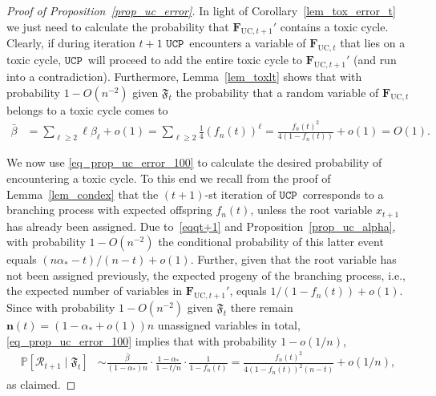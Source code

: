 \documentclass[10pt,reqno]{amsart}
\newcommand\mk[1]{\textcolor{cyan}{#1}}
\renewcommand\mk[1]{#1}
\numberwithin{equation}{section}
\renewcommand{\vec}[1]{\boldsymbol{#1}}
\newcommand{\FUC}[1]{\PHI_{\mathrm{UC},{#1}}}
\newcommand{\UCP}{\ensuremath{\mathtt{UCP}}}
\newcommand\PHI{\vec F}
\newcommand\cR{\mathcal R}
\newcommand\fF{\mathfrak F}
\newcommand\vn{\vec n}
\newcommand\bc[1]{\left({#1}\right)}
\newcommand\brk[1]{\left\lbrack{#1}\right\rbrack}
\newcommand\pr{\mathbb{P}}
\newcommand\Lem{Lemma}
\newcommand\Prop{Proposition}
\newcommand\Cor{Corollary}
\def\pr{{\mathbb P}}
\begin{document}
\begin{proof}[Proof of \Prop~\ref{prop_uc_error}]
	In light of \Cor~\ref{lem_tox_error_t} we just need to calculate the probability that $\FUC{t+1}'$ contains a toxic cycle.
	Clearly, if during iteration $t+1$ \UCP\ encounters a variable of $\FUC t$ that lies on a toxic cycle, \UCP\ will proceed to add the entire toxic cycle to $\FUC{t+1}'$ (and run into a contradiction).
	Furthermore, \Lem~\ref{lem_toxlt} shows that with probability $1-O(n^{-2})$ given $\fF_t$ the probability that a random variable of $\FUC t$ belongs to a toxic cycle comes to
	\begin{align}\label{eq_prop_uc_error_100}
		\bar\beta&=\sum_{\ell\geq2}\ell\beta_\ell+o(1)\mk{= \sum_{\ell \geq 2}  \frac 1 {4} \bc{f_n(t)}^\ell }= \frac{f_n(t)^2}{4(1-f_n(t))} +o(1)=O(1).
	\end{align}

	We now use \eqref{eq_prop_uc_error_100} to calculate the desired probability of encountering a toxic cycle.
	To this end we recall from the proof of \Lem~\ref{lem_condex} that the $(t+1)$-st iteration of \UCP\ corresponds to a branching process with expected offspring $f_n(t)$, unless the root variable $x_{t+1}$ has already been assigned.
	Due to~\eqref{eqqt+1} and \Prop~\ref{prop_uc_alpha}, with probability $1-O(n^{-2})$ the conditional probability of this latter event equals $(n\alpha_*-t)/(n-t)+o(1)$.
	Further, given that the root variable has not been assigned previously, the expected progeny of the branching process, i.e., the expected number of variables in $\FUC{t+1}'$, equals $1/(1-f_n(t))+o(1)$.
	Since with probability $1-O(n^{-2})$ given $\fF_t$ there remain $\vn(t)=(1-\alpha_*+o(1))n$ unassigned variables in total, \eqref{eq_prop_uc_error_100} implies that with probability $1-o(1/n)$,
	\begin{align*}
		\pr\brk{\cR_{t+1}\mid\fF_t}&\sim\frac{\bar\beta}{(1-\alpha_*)n}\cdot\frac{1-\alpha_*}{1-t/n}\cdot\frac1{1-f_n(t)}=\frac{f_n(t)^2}{4(1-f_n(t))^2(n-t)}+o(1/n),
	\end{align*}
	as claimed.
\end{proof}
\end{document}
